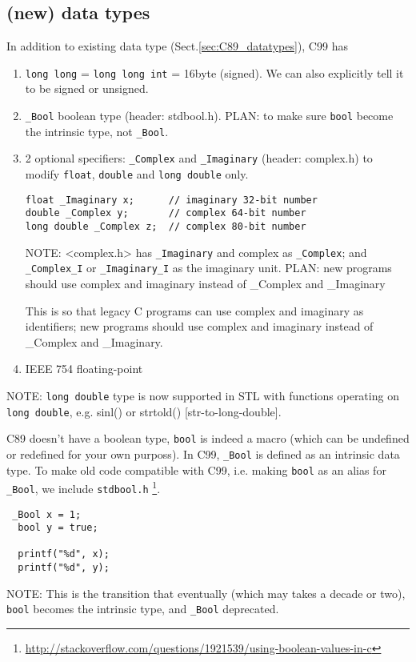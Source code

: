 \subsection{(new) data types}

In addition to existing data type (Sect.\ref{sec:C89_datatypes}), C99 has 
\begin{enumerate}
  \item \verb!long long! = \verb!long long int! = 16byte (signed).  We can also explicitly
  tell it to be signed or unsigned.
  
  \item \verb!_Bool! boolean type (header: stdbool.h). PLAN: to make sure
  \verb!bool! become the intrinsic type, not \verb!_Bool!.
  
  \item 2 optional specifiers: \verb!_Complex! and \verb!_Imaginary! (header:
  complex.h) to modify \verb!float!, \verb!double! and \verb!long double! only.
  \begin{lstlisting}
float _Imaginary x;      // imaginary 32-bit number
double _Complex y;       // complex 64-bit number
long double _Complex z;  // complex 80-bit number  
  \end{lstlisting}
NOTE: <complex.h> has \verb!_Imaginary! and complex as \verb!_Complex!; and
\verb!_Complex_I! or \verb!_Imaginary_I! as the imaginary unit. PLAN: new
programs should use complex and imaginary instead of \_Complex and \_Imaginary
  
This is so that legacy C programs can use complex and imaginary as
identifiers; new programs should use complex and imaginary instead of \_Complex
and \_Imaginary.
  
  \item IEEE 754 floating-point
\end{enumerate}

NOTE: \verb!long double! type is now supported in STL with functions operating
on \verb!long double!, e.g. sinl() or strtold() [str-to-long-double]. 
 
C89 doesn't have a boolean type, \verb!bool! is indeed a macro (which can be
undefined or redefined for your own purposs). In C99, \verb!_Bool! is defined as
an intrinsic data type. To make old code compatible with C99, i.e. making
\verb!bool! as an alias  for \verb!_Bool!, we include \verb!stdbool.h!
\footnote{\url{http://stackoverflow.com/questions/1921539/using-boolean-values-in-c}}.
\begin{lstlisting}
 _Bool x = 1;
  bool y = true;

  printf("%d", x);
  printf("%d", y);
\end{lstlisting}
NOTE: This is the transition that eventually (which may takes a decade or two),
\verb!bool! becomes the intrinsic type, and \verb!_Bool! deprecated.

